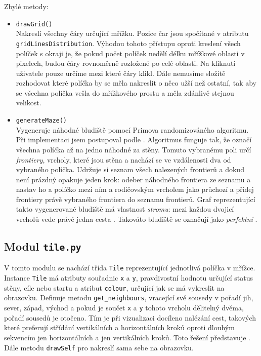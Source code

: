 \documentclass[12pt]{report}			%
\begin{document}
Zbylé metody:
\begin{itemize}
			\setlength\itemsep{0.01mm}
\item \texttt{drawGrid()}\\
Nakreslí všechny čáry určující mřížku. Pozice čar jsou spočítané v atributu \\ \texttt{gridLinesDistribution}. Výhodou tohoto přístupu oproti kreslení všech políček s okraji je, že pokud počet políček nedělí délku mřížkové oblasti v pixelech, budou čáry rovnoměrně rozložené po celé oblasti. Na kliknutí uživatele pouze určíme mezi které čáry klikl. Dále nemusíme složitě rozhodovat které políčka by se měla nakreslit o něco užší než ostatní, tak aby se všechna políčka vešla do mřížkového prostu a měla zdánlivě stejnou velikost.
\item \texttt{generateMaze()}\\
Vygeneruje náhodné bludiště pomocí Primova randomizováného algoritmu. Při implementaci jsem postupoval podle \cite{prim}.
Algoritmus funguje tak, že označí všechna políčka až na jedno náhodné za stěny. Tomuto vybranému poli určí \emph{frontiery}, vrcholy, které jsou stěna a nachází se ve vzdálenosti dva od vybraného políčka. Udržuje si seznam všech nalezených frontierů a dokud není prázdný opakuje jeden krok: odeber náhodného frontiera ze seznamu a nastav ho a políčko mezi ním a rodičovským vrcholem jako průchozí a přidej frontiery právě vybraného frontiera do seznamu frontierů. Graf reprezentující takto vygenerované bludiště má vlastnost \emph{stromu}: mezi každou dvojicí vrcholů vede právě jedna cesta \cite{pruvodce}. Takováto bludiště se označují jako \emph{perfektní} \cite{maze}.
		
\end{itemize}
			
			
			\subsection{Modul \texttt{tile.py}}
			V tomto modulu se nachází třída \texttt{Tile} reprezentující jednotlivá políčka v mřížce. Instance \texttt{Tile} má atributy souřadnic \texttt{x} a \texttt{y}, pravdivostní hodnotu určující status stěny, cíle nebo startu a atribut \texttt{colour}, určující jak se má vykreslit na obrazovku. Definuje metodu \texttt{get\_neighbours}, vracející své sousedy v pořadí jih, sever, západ, východ a pokud je součet \texttt{x} a \texttt{y} tohoto vrcholu dělitelný dvěma, pořadí sousedů je otočeno. Tím je při vizualizaci docíleno nalézání  cest, takových které preferují střídání vertikálních a horizontálních kroků oproti dlouhým sekvencím jen horizontálních a jen vertikálních kroků. Toto řešení představuje \cite{patel_implementation}. Dále metodu \texttt{drawSelf} pro nakreslí sama sebe na obrazovku.
			
\end{document}
